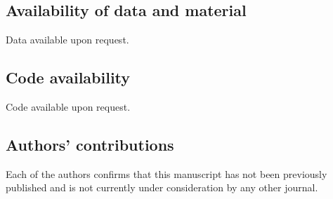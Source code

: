 \subsection{Availability of data and material}
Data available upon request.

\subsection{Code availability}
Code available upon request.

\subsection{Authors' contributions}
Each of the authors confirms that this manuscript has not been previously published and is not currently under consideration by any other journal.




%
%
 



